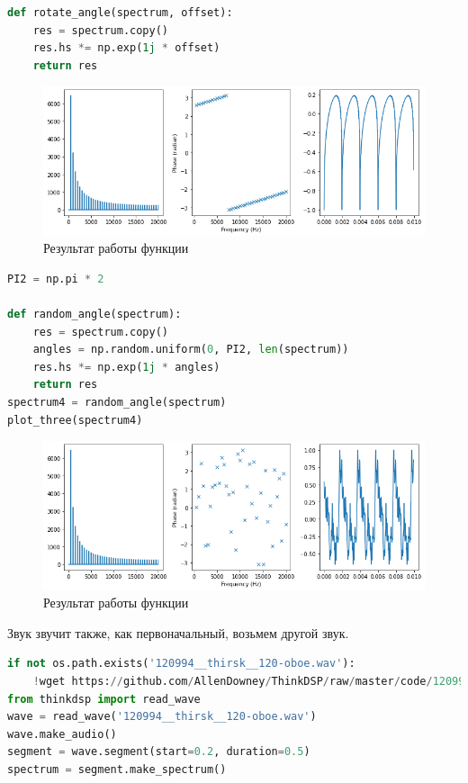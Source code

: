 \begin{lstlisting}[language=Python]
def rotate_angle(spectrum, offset):
    res = spectrum.copy()
    res.hs *= np.exp(1j * offset)
    return res
\end{lstlisting}
\begin{figure}[H]
	\begin{center}
		\includegraphics[scale=0.66]{fig/lab06/lab06_8.png}
		\caption{Результат работы функции}
	\end{center}
\end{figure}


\begin{lstlisting}[language=Python]
PI2 = np.pi * 2

def random_angle(spectrum):
    res = spectrum.copy()
    angles = np.random.uniform(0, PI2, len(spectrum))
    res.hs *= np.exp(1j * angles)
    return res
spectrum4 = random_angle(spectrum)
plot_three(spectrum4)
\end{lstlisting}
\begin{figure}[H]
	\begin{center}
		\includegraphics[scale=0.66]{fig/lab06/lab06_9.png}
		\caption{Результат работы функции}
	\end{center}
\end{figure}

Звук звучит также, как первоначальный, возьмем другой звук. 

\begin{lstlisting}[language=Python]
if not os.path.exists('120994__thirsk__120-oboe.wav'):
    !wget https://github.com/AllenDowney/ThinkDSP/raw/master/code/120994__thirsk__120-oboe.wav
from thinkdsp import read_wave
wave = read_wave('120994__thirsk__120-oboe.wav')
wave.make_audio()
segment = wave.segment(start=0.2, duration=0.5)
spectrum = segment.make_spectrum()
\end{lstlisting}

